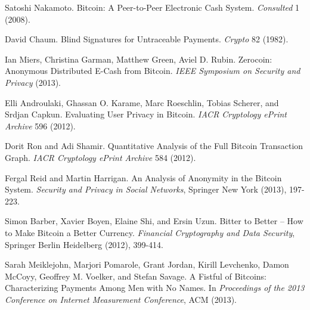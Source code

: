 \documentclass[conference]{IEEEtran}
\begin{document}
\begin{thebibliography}{1}

 Satoshi Nakamoto. Bitcoin: A Peer-to-Peer Electronic Cash System. \emph{Consulted} 1 (2008).

 David Chaum. Blind Signatures for Untraceable Payments. \emph{Crypto} 82 (1982).

 Ian Miers, Christina Garman, Matthew Green, Aviel D. Rubin. Zerocoin: Anonymous Distributed E-Cash from Bitcoin. \emph{IEEE Symposium on Security and Privacy} (2013).

 Elli Androulaki, Ghassan O. Karame, Marc Roeschlin, Tobias Scherer, and Srdjan Capkun. Evaluating User Privacy in Bitcoin. \emph{IACR Cryptology ePrint Archive} 596 (2012).

 Dorit Ron and Adi Shamir. Quantitative Analysis of the Full Bitcoin Transaction Graph. \emph{IACR Cryptology ePrint Archive} 584 (2012).

 Fergal Reid and Martin Harrigan. An Analysis of Anonymity in the Bitcoin System. \emph{Security and Privacy in Social Networks}, Springer New York (2013), 197-223.

 Simon Barber, Xavier Boyen, Elaine Shi, and Ersin Uzun. Bitter to Better -- How to Make Bitcoin a Better Currency. \emph{Financial Cryptography and Data Security}, Springer Berlin Heidelberg (2012), 399-414.

 Sarah Meiklejohn, Marjori Pomarole, Grant Jordan, Kirill Levchenko, Damon McCoyy, Geoffrey M. Voelker, and  Stefan Savage. A Fistful of Bitcoins: Characterizing Payments Among Men with No Names. In \emph{Proceedings of the 2013 Conference on Internet Measurement Conference}, ACM (2013).



\end{thebibliography}




\end{document}
